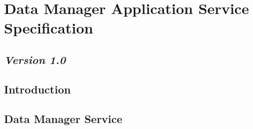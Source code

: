 \chapter{Data Manager Application Service Specification}
\section*{\textit{Version 1.0}}
\section{Introduction}
\section{Data Manager Service}
\orgcishellappservicedatamanager{}